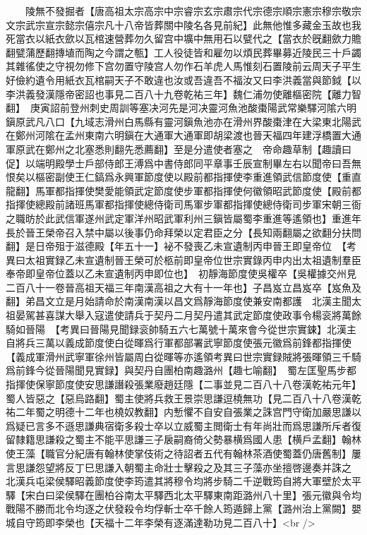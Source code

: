 　　陵無不發掘者【唐高祖太宗高宗中宗睿宗玄宗肅宗代宗德宗順宗憲宗穆宗敬宗文宗武宗宣宗懿宗僖宗凡十八帝皆葬關中陵名各見前紀】此無他惟多藏金玉故也我死當衣以紙衣歛以瓦棺速營葬勿久留宫中壙中無用石以甓代之【當衣於旣翻歛力贍翻甓蒲歷翻摶埴而陶之今謂之甎】工人役徒皆和雇勿以煩民葬畢募近陵民三十戶蠲其雜徭使之守視勿修下宫勿置守陵宫人勿作石羊虎人馬惟刻石置陵前云周天子平生好儉約遺令用紙衣瓦棺嗣天子不敢違也汝或吾違吾不福汝又曰李洪義當與節鉞【以李洪義發漢隱帝密詔也事見二百八十九卷乾祐三年】魏仁浦勿使離樞密院【離力智翻】　庚寅詔前登州刺史周訓等塞决河先是河决靈河魚池酸棗陽武常樂驛河隂六明鎭原武凡八口【九域志滑州白馬縣有靈河鎭魚池亦在滑州界酸棗津在大梁東北陽武在鄭州河隂在孟州東南六明鎭在大通軍大通軍即胡梁渡也晉天福四年建浮橋置大通軍原武在鄭州之北塞悉則翻先悉薦翻】至是分遣使者塞之　帝命趣草制【趣讀曰促】以端明殿學士戶部侍郎王溥爲中書侍郎同平章事壬辰宣制畢左右以聞帝曰吾無恨矣以樞密副使王仁鎬爲永興軍節度使以殿前都指揮使李重進領武信節度使【重直龍翻】馬軍都指揮使樊愛能領武定節度使步軍都指揮使何徽領昭武節度使【殿前都指揮使總殿前諸班馬軍都指揮使總侍衛司馬軍步軍都指揮使總侍衛司步軍宋朝三衙之職昉於此武信軍遂州武定軍洋州昭武軍利州三鎭皆屬蜀李重進等遙領也】重進年長於晉王榮帝召入禁中屬以後事仍命拜榮以定君臣之分【長知兩翻屬之欲翻分扶問翻】是日帝殂于滋德殿【年五十一】袐不發喪乙未宣遺制丙申晉王即皇帝位　【考異曰太祖實録乙未宣遺制晉王榮可於柩前即皇帝位世宗實錄丙申内出太祖遺制羣臣奉帝即皇帝位蓋以乙未宣遺制丙申即位也】　初靜海節度使吳權卒【吳權據交州見二百八十一卷晉高祖天福三年南漢高祖之大有十一年也】子昌岌立昌岌卒【岌魚及翻】弟昌文立是月始請命於南漢南漢以昌文爲靜海節度使兼安南都護　北漢主聞太祖晏駕甚喜謀大舉入寇遣使請兵于契丹二月契丹遣其武定節度使政事令楊衮將萬餘騎如晉陽　【考異曰晉陽見聞録衮帥騎五六七萬號十萬來會今從世宗實鋉】北漢主自將兵三萬以義成節度使白從暉爲行軍都部署武寧節度使張元徽爲前鋒都指揮使【義成軍滑州武寧軍徐州皆屬周白從暉等亦遙領考異曰世宗實録賊將張暉領三千騎爲前鋒今從晉陽聞見實録】與契丹自團柏南趣潞州【趣七喻翻】　蜀左匡聖馬步都指揮使保寧節度使安思謙譖殺張業廢趙廷隱【二事並見二百八十八卷漢乾祐元年】蜀人皆惡之【惡烏路翻】蜀主使將兵救王景崇思謙逗橈無功【見二百八十八卷漢乾祐二年蜀之明德十二年也橈奴教翻】内慙懼不自安自張業之誅宫門守衛加嚴思謙以爲疑已言多不遜思謙典宿衛多殺士卒以立威蜀主閲衛士有年尚壯而爲思謙所斥者復留隸籍思謙殺之蜀主不能平思謙三子扆嗣裔倚父勢暴横爲國人患【横戶孟翻】翰林使王藻【職官分紀唐有翰林使掌伎術之待詔者五代有翰林茶酒使蜀蓋仍唐舊制】屢言思謙怨望將反丁巳思謙入朝蜀主命壯士擊殺之及其三子藻亦坐擅啓邊奏并誅之　北漢兵屯梁侯驛昭義節度使李筠遣其將穆令均將步騎二千逆戰筠自將大軍壁於太平驛【宋白曰梁侯驛在團柏谷南太平驛西北太平驛東南距潞州八十里】張元徽與令均戰陽不勝而北令均逐之伏發殺令均俘斬士卒千餘人筠遁歸上黨【潞州治上黨闕】嬰城自守筠即李榮也【天福十二年李榮有逐滿達勒功見二百八十】<br />
